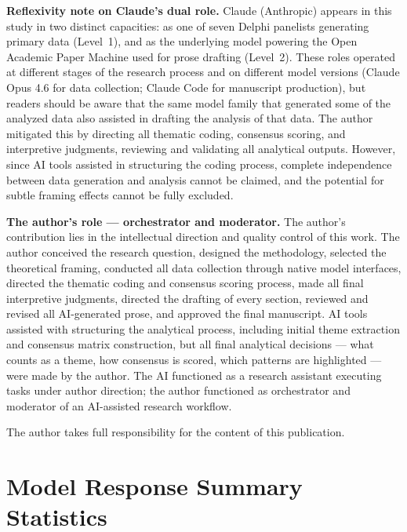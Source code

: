\documentclass[preprint,review,12pt]{elsarticle}
\begin{document}
\textbf{Reflexivity note on Claude's dual role.} Claude (Anthropic) appears in this study in two distinct capacities: as one of seven Delphi panelists generating primary data (Level~1), and as the underlying model powering the Open Academic Paper Machine used for prose drafting (Level~2). These roles operated at different stages of the research process and on different model versions (Claude Opus 4.6 for data collection; Claude Code for manuscript production), but readers should be aware that the same model family that generated some of the analyzed data also assisted in drafting the analysis of that data. The author mitigated this by directing all thematic coding, consensus scoring, and interpretive judgments, reviewing and validating all analytical outputs. However, since AI tools assisted in structuring the coding process, complete independence between data generation and analysis cannot be claimed, and the potential for subtle framing effects cannot be fully excluded.

\textbf{The author's role --- orchestrator and moderator.} The author's contribution lies in the intellectual direction and quality control of this work. The author conceived the research question, designed the methodology, selected the theoretical framing, conducted all data collection through native model interfaces, directed the thematic coding and consensus scoring process, made all final interpretive judgments, directed the drafting of every section, reviewed and revised all AI-generated prose, and approved the final manuscript. AI tools assisted with structuring the analytical process, including initial theme extraction and consensus matrix construction, but all final analytical decisions --- what counts as a theme, how consensus is scored, which patterns are highlighted --- were made by the author. The AI functioned as a research assistant executing tasks under author direction; the author functioned as orchestrator and moderator of an AI-assisted research workflow.

The author takes full responsibility for the content of this publication.


\appendix

\section{Model Response Summary Statistics}
\label{sec:appendix_a}
\end{document}
